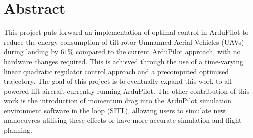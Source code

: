 \chapter*{Abstract}

\vspace*{2em}

This project puts forward an implementation of optimal control in ArduPilot to reduce the energy consumption of tilt rotor Unmanned Aerial Vehicles (UAVs) during landing by $61\%$ compared to the current ArduPilot approach, with no hardware changes required. This is achieved through the use of a time-varying linear quadratic regulator control approach and a precomputed optimised trajectory. The goal of this project is to eventually expand this work to all powered-lift aircraft currently running ArduPilot. The other contribution of this work is the introduction of momentum drag into the ArduPilot simulation environment software in the loop (SITL), allowing users to simulate new manoeuvres utilising these effects or have more accurate simulation and flight planning.